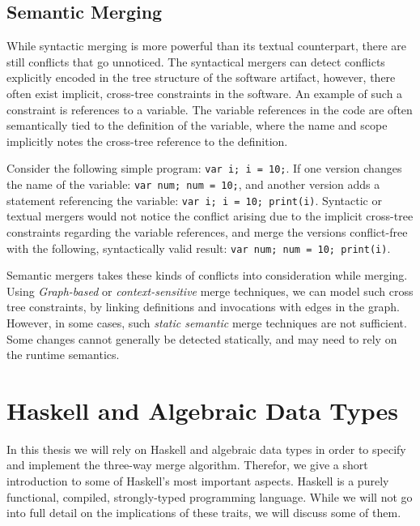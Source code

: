 \documentclass[a4paper,english]{ifimaster}
\begin{document}
\subsection{Semantic Merging}%
\label{sub:semantic_merging}

While syntactic merging is more powerful than its textual counterpart, there are still conflicts that go unnoticed. The syntactical mergers can detect conflicts explicitly encoded in the tree structure of the software artifact, however, there often exist implicit, cross-tree constraints in the software. An example of such a constraint is references to a variable. The variable references in the code are often semantically tied to the definition of the variable, where the name and scope implicitly notes the cross-tree reference to the definition.

Consider the following simple program: \texttt{var i; i = 10;}. If one version changes the name of the variable: \texttt{var num; num = 10;}, and another version adds a statement referencing the variable: \texttt{var i; i = 10; print(i)}. Syntactic or textual mergers would not notice the conflict arising due to the implicit cross-tree constraints regarding the variable references, and merge the versions conflict-free with the following, syntactically valid result: \texttt{var num; num = 10; print(i)}.

Semantic mergers takes these kinds of conflicts into consideration while merging. Using \textit{Graph-based}  or \textit{context-sensitive} merge techniques, we can model such cross tree constraints, by linking definitions and invocations with edges in the graph. However, in some cases, such \textit{static semantic} merge techniques are not sufficient. Some changes cannot generally be detected statically, and may need to rely on the runtime semantics.

\section{Haskell and Algebraic Data Types}%
\label{sec:haskell_and_algebraic_data_types}

In this thesis we will rely on Haskell and algebraic data types in order to specify and implement the three-way merge algorithm. Therefor, we give a short introduction to some of Haskell's most important aspects. Haskell is a purely functional, compiled, strongly-typed programming language. While we will not go into full detail on the implications of these traits, we will discuss some of them.
\end{document}
